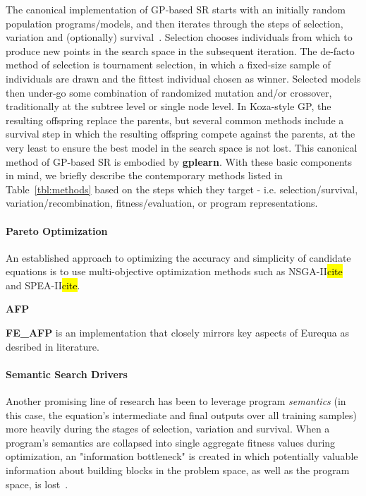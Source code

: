 

The canonical implementation of GP-based SR starts with an initially random population programs/models, and then iterates through the steps of selection, variation and (optionally) survival~\cite{poliFieldGuideGenetic2008}.
Selection chooses individuals from which to produce new points in the search space in the subsequent iteration. 
The de-facto method of selection is tournament selection, in which a fixed-size sample of individuals are drawn and the fittest individual chosen as winner. 
Selected models then under-go some combination of randomized mutation and/or crossover, traditionally at the subtree level or single node level.
In Koza-style GP, the resulting offspring replace the parents, but several common methods include a survival step in which the resulting offspring compete against the parents, at the very least to ensure the best model in the search space is not lost.
This canonical method of GP-based SR is embodied by \textbf{gplearn}. 
With these basic components in mind, we briefly describe the contemporary methods listed in Table~\ref{tbl:methods} based on the steps which they target - i.e. selection/survival, variation/recombination, fitness/evaluation, or program representations. 

\paragraph{Pareto Optimization}

An established approach to optimizing the accuracy and simplicity of candidate equations is to use multi-objective optimization methods such as NSGA-II\hl{cite} and SPEA-II\hl{cite}. 

\textbf{AFP}

\textbf{FE\_AFP} is an implementation that closely mirrors key aspects of Eurequa as desribed in literature. 

\paragraph{Semantic Search Drivers}

Another promising line of research has been to leverage program \textit{semantics} (in this case, the equation's intermediate and final outputs over all training samples) more heavily during the stages of selection, variation and survival. 
When a program's semantics are collapsed into single aggregate fitness values during optimization, an "information bottleneck" is created in which potentially valuable information about building blocks in the problem space, as well as the program space, is lost~\cite{azadKrzysztofKrawiecBehavioral2017}. 

